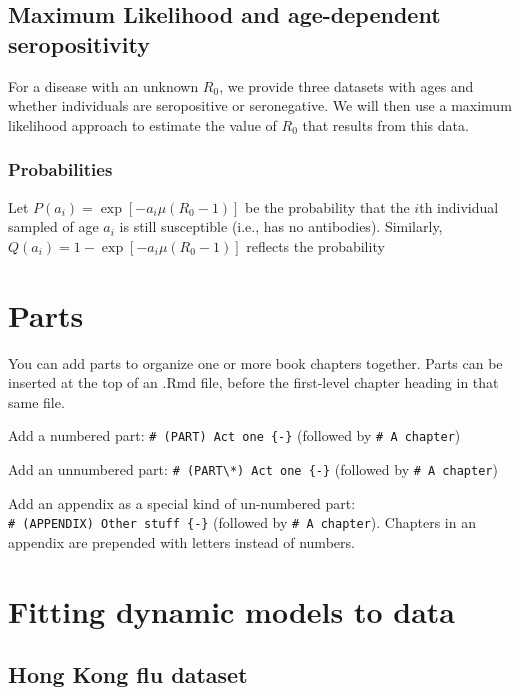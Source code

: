 \documentclass[
]{book}
\theoremstyle{definition}
\theoremstyle{definition}
\theoremstyle{definition}
\theoremstyle{definition}
\theoremstyle{remark}
\begin{document}
\section{Maximum Likelihood and age-dependent seropositivity}\label{maximum-likelihood-and-age-dependent-seropositivity}

For a disease with an unknown \(R_{0}\), we provide
three datasets with ages and whether individuals are seropositive
or seronegative. We will then use a maximum likelihood
approach to estimate the value of \(R_{0}\) that results from this data.

\subsection{Probabilities}\label{probabilities}

Let \(P(a_{i}) = \exp \left [-a_{i}\mu \left (R_{0} - 1 \right ) \right ]\) be the probability that the \(i\)th individual sampled of age \(a_{i}\) is still susceptible (i.e., has no antibodies). Similarly, \(Q(a_{i}) = 1 - \exp \left [-a_{i}\mu \left (R_{0} - 1 \right ) \right ]\) reflects the probability

\chapter{Parts}\label{parts}

You can add parts to organize one or more book chapters together. Parts can be inserted at the top of an .Rmd file, before the first-level chapter heading in that same file.

Add a numbered part: \texttt{\#\ (PART)\ Act\ one\ \{-\}} (followed by \texttt{\#\ A\ chapter})

Add an unnumbered part: \texttt{\#\ (PART\textbackslash{}*)\ Act\ one\ \{-\}} (followed by \texttt{\#\ A\ chapter})

Add an appendix as a special kind of un-numbered part: \texttt{\#\ (APPENDIX)\ Other\ stuff\ \{-\}} (followed by \texttt{\#\ A\ chapter}). Chapters in an appendix are prepended with letters instead of numbers.

\chapter{Fitting dynamic models to data}\label{fitting-dynamic-models-to-data}

\section{Hong Kong flu dataset}\label{hong-kong-flu-dataset}
\end{document}
